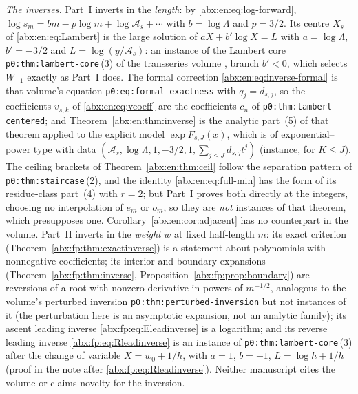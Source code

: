 \documentclass[11pt,letterpaper]{article}
\numberwithin{equation}{section}
\theoremstyle{remark}\newtheorem{remark}[theorem]{Remark}
\begin{document}
\emph{The inverses.} Part~I inverts in the \emph{length}: by \eqref{abx:en:eq:log-forward}, $\log s_m=bm-p\log m+\log\mathcal A_s+\cdots$ with $b=\log\Lambda$ and $p=3/2$. Its centre $X_s$ of \eqref{abx:en:eq:Lambert} is the large solution of $aX+b'\log X=L$ with $a=\log\Lambda$, $b'=-3/2$ and $L=\log(y/\mathcal A_s)$: an instance of the Lambert core \texttt{p0:thm:lambert-core}\,(3) of the transseries volume \cite{TSvol}, branch $b'<0$, which selects $W_{-1}$ exactly as Part~I does. The formal correction \eqref{abx:en:eq:inverse-formal} is that volume's equation \texttt{p0:eq:formal-exactness} with $q_j=d_{s,j}$, so the coefficients $v_{s,k}$ of \eqref{abx:en:eq:vcoeff} are the coefficients $c_n$ of \texttt{p0:thm:lambert-centered}; and Theorem~\ref{abx:en:thm:inverse} is the analytic part~(5) of that theorem applied to the explicit model $\exp F_{s,J}(x)$, which is of exponential--power type with data $(\mathcal A_s,\log\Lambda,1,-3/2,1,\sum_{j\le J}d_{s,j}t^j)$ (instance, for $K\le J$). The ceiling brackets of Theorem~\ref{abx:en:thm:ceil} follow the separation pattern of \texttt{p0:thm:staircase}\,(2), and the identity \eqref{abx:en:eq:full-min} has the form of its residue-class part~(4) with $r=2$; but Part~I proves both directly at the integers, choosing no interpolation of $e_m$ or $o_m$, so they are \emph{not} instances of that theorem, which presupposes one. Corollary~\ref{abx:en:cor:adjacent} has no counterpart in the volume. Part~II inverts in the \emph{weight} $w$ at fixed half-length $m$: its exact criterion (Theorem~\ref{abx:fp:thm:exactinverse}) is a statement about polynomials with nonnegative coefficients; its interior and boundary expansions (Theorem~\ref{abx:fp:thm:inverse}, Proposition~\ref{abx:fp:prop:boundary}) are reversions of a root with nonzero derivative in powers of $m^{-1/2}$, analogous to the volume's perturbed inversion \texttt{p0:thm:perturbed-inversion} but not instances of it (the perturbation here is an asymptotic expansion, not an analytic family); its ascent leading inverse \eqref{abx:fp:eq:Eleadinverse} is a logarithm; and its reverse leading inverse \eqref{abx:fp:eq:Rleadinverse} is an instance of \texttt{p0:thm:lambert-core}\,(3) after the change of variable $X=w_0+1/h$, with $a=1$, $b=-1$, $L=\log h+1/h$ (proof in the note after \eqref{abx:fp:eq:Rleadinverse}). Neither manuscript cites the volume or claims novelty for the inversion.
\end{document}
